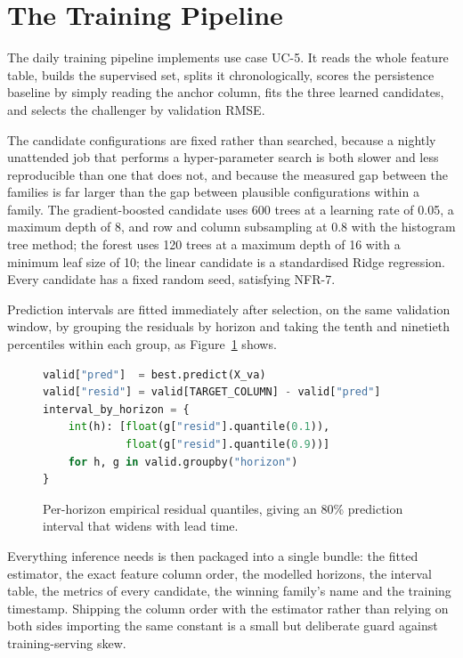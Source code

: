 \section{The Training Pipeline}
The daily training pipeline implements use case UC-5. It reads the whole feature
table, builds the supervised set, splits it chronologically, scores the
persistence baseline by simply reading the anchor column, fits the three learned
candidates, and selects the challenger by validation RMSE.

The candidate configurations are fixed rather than searched, because a nightly
unattended job that performs a hyper-parameter search is both slower and less
reproducible than one that does not, and because the measured gap between the
families is far larger than the gap between plausible configurations within a
family. The gradient-boosted candidate uses 600 trees at a learning rate of 0.05,
a maximum depth of 8, and row and column subsampling at 0.8 with the histogram
tree method; the forest uses 120 trees at a maximum depth of 16 with a minimum
leaf size of 10; the linear candidate is a standardised Ridge regression. Every
candidate has a fixed random seed, satisfying NFR-7.

Prediction intervals are fitted immediately after selection, on the same
validation window, by grouping the residuals by horizon and taking the tenth and
ninetieth percentiles within each group, as Figure~\ref{fig:code-interval} shows.

\begin{figure}[htbp]\centering
\begin{lstlisting}[language=Python]
valid["pred"]  = best.predict(X_va)
valid["resid"] = valid[TARGET_COLUMN] - valid["pred"]
interval_by_horizon = {
    int(h): [float(g["resid"].quantile(0.1)),
             float(g["resid"].quantile(0.9))]
    for h, g in valid.groupby("horizon")
}
\end{lstlisting}
\codegap
\caption{Per-horizon empirical residual quantiles, giving an 80\% prediction
interval that widens with lead time.}
\label{fig:code-interval}
\end{figure}

Everything inference needs is then packaged into a single bundle: the fitted
estimator, the exact feature column order, the modelled horizons, the interval
table, the metrics of every candidate, the winning family's name and the training
timestamp. Shipping the column order with the estimator rather than relying on
both sides importing the same constant is a small but deliberate guard against
training-serving skew.

